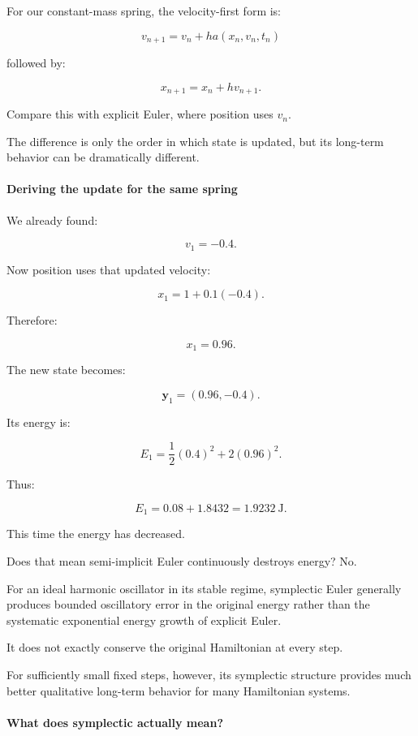 For our constant-mass spring, the velocity-first form is:

\[
\boxed{ v_{n+1}=v_n+h a(x_n,v_n,t_n) }
\]

followed by:

\[
\boxed{ x_{n+1}=x_n+h v_{n+1} }.
\]

Compare this with explicit Euler, where position uses \(v_n\).

The difference is only the order in which state is updated, but its long-term behavior can be dramatically different.

\paragraph{Deriving the update for the same spring}\label{02-foundations-ii-ch025-deriving-the-update-for-the-same-spring}

We already found:

\[
v_1=-0.4.
\]

Now position uses that updated velocity:

\[
x_1=1+0.1(-0.4).
\]

Therefore:

\[
\boxed{x_1=0.96}.
\]

The new state becomes:

\[
\boxed{\mathbf y_1=(0.96,-0.4)}.
\]

Its energy is:

\[
E_1= \frac12(0.4)^2+ 2(0.96)^2.
\]

Thus:

\[
E_1=0.08+1.8432=\boxed{1.9232\ \mathrm J}.
\]

This time the energy has decreased.

Does that mean semi-implicit Euler continuously destroys energy? No.

For an ideal harmonic oscillator in its stable regime, symplectic Euler generally produces bounded oscillatory error in the original energy rather than the systematic exponential energy growth of explicit Euler.

It does not exactly conserve the original Hamiltonian at every step.

For sufficiently small fixed steps, however, its symplectic structure provides much better qualitative long-term behavior for many Hamiltonian systems.

\paragraph{What does symplectic actually mean?}\label{02-foundations-ii-ch025-what-does-symplectic-actually-mean}

